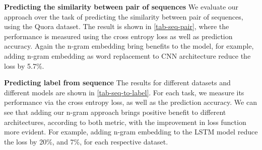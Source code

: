 \noindent \textbf{Predicting the similarity between pair of sequences}
We evaluate our approach over the task of predicting the similarity between pair of sequences, using the Quora dataset. The result is shown in \autoref{tab-seq-pair}, where the performance is measured using the cross entropy loss as well as prediction accuracy. Again the n-gram embedding bring benefits to the model, for example, adding n-gram embedding as word replacement to CNN architecture reduce the loss by 5.7\%.

\noindent \textbf{Predicting label from sequence}
The results for different datasets and different models are shown in \autoref{tab-seq-to-label}. For each task, we measure its performance via the cross entropy loss, as well as the prediction accuracy. We can see that adding our n-gram approach brings positive benefit to different architectures, according to both metric, with the improvement in loss function more evident. For example, adding n-gram embedding to the LSTM model reduce the loss by 20\%, and 7\%, for each respective dataset.


\begin{table*}
\vspace{15pt}
\caption{Results of N-gram embedding on Text Classification}
\label{tab-seq-to-label}

\centering
{}

\vspace{-15pt}
\end{table*}


